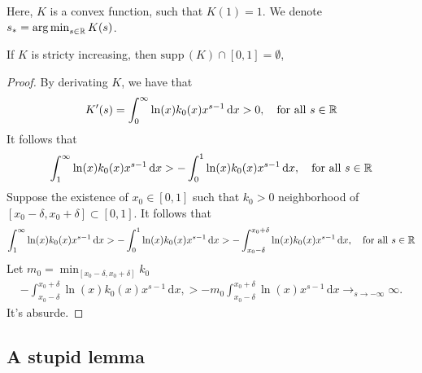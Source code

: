 \documentclass[11pt]{amsart}
\newcommand{\diff}{\,\mathrm{d}}
\newcommand{\supp}{\mathrm{supp}\,}
\begin{document}
Here, $K$ is a convex function, such that $K(1) = 1$. We denote $s_* = \mathop{\arg\min}_{s\in \mathbb{R}} K(s)$. 

\begin{lemma}If $K$ is stricty increasing, then 
    $\supp(K) \cap [0,1] = \emptyset$,
\end{lemma}
\begin{proof}By derivating $K$, we have that 
    \begin{align*}
        K'(s) = \int_0^\infty \ln(x)k_0(x)x^{s-1}\diff x > 0,\quad \text{for all $s \in \RR$}
    \end{align*}
It follows that 
\begin{align*}
    \int_1^\infty \ln(x)k_0(x)x^{s-1}\diff x > -\int_0^1 \ln(x)k_0(x)x^{s-1}\diff x,\quad \text{for all $s \in \RR$}
\end{align*}
Suppose the existence of $x_0 \in [0,1]$ such that $k_0 > 0$ neighborhood of $[x_0-\delta, x_0+\delta] \subset[0,1]$. It follows that 
\begin{align*}
    \int_1^\infty \ln(x)k_0(x)x^{s-1}\diff x > -\int_0^1 \ln(x)k_0(x)x^{s-1}\diff x
    > -\int_{x_0-\delta}^{x_0+\delta} \ln(x)k_0(x)x^{s-1}\diff x,\quad \text{for all $s \in \RR$}
\end{align*}
Let $m_0 = \min_{[x_0-\delta, x_0+\delta]} k_0$
\begin{align*}
    -\int_{x_0-\delta}^{x_0+\delta} \ln(x)k_0(x)x^{s-1}\diff x,
    > - m_0\int_{x_0-\delta}^{x_0+\delta} \ln(x)x^{s-1}\diff x
    \to_{s \to -\infty} \infty.
\end{align*}
It's absurde. 
\end{proof}

\subsection{A stupid lemma}
\end{document}
